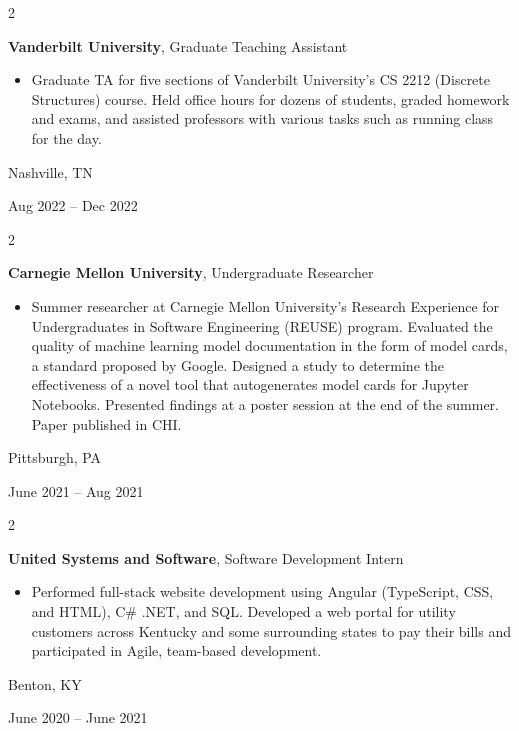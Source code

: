 \documentclass[10pt, letterpaper]{article}
\newenvironment{highlights}{
    \begin{itemize}[
        topsep=0.10 cm,
        parsep=0.10 cm,
        partopsep=0pt,
        itemsep=0pt,
        leftmargin=0.4 cm + 10pt
    ]
}{
    \end{itemize}
} %
\newenvironment{twocolentry}[2][]{
    \onecolentry
    \def\secondColumn{#2}
    \setcolumnwidth{\fill, 4.5 cm}
    \begin{paracol}{2}
}{
    \switchcolumn \raggedleft \secondColumn
    \end{paracol}
    \endonecolentry
} %
\begin{document}
        \vspace{0.2 cm}

        \begin{twocolentry}{
            Nashville, TN

        Aug 2022 – Dec 2022
        }
            \textbf{Vanderbilt University}, Graduate Teaching Assistant
            \begin{highlights}
                \item Graduate TA for five sections of Vanderbilt University's CS 2212 (Discrete Structures) course. Held office hours for dozens of students, graded homework and exams, and assisted professors with various tasks such as running class for the day.
            \end{highlights}
        \end{twocolentry}


        \vspace{0.2 cm}

        \begin{twocolentry}{
            Pittsburgh, PA

        June 2021 – Aug 2021
        }
            \textbf{Carnegie Mellon University}, Undergraduate Researcher
            \begin{highlights}
                \item Summer researcher at Carnegie Mellon University’s Research Experience for Undergraduates in Software Engineering (REUSE) program. Evaluated the quality of machine learning model documentation in the form of model cards, a standard proposed by Google. Designed a study to determine the effectiveness of a novel tool that autogenerates model cards for Jupyter Notebooks. Presented findings at a poster session at the end of the summer. Paper published in CHI.
            \end{highlights}
        \end{twocolentry}


        \vspace{0.2 cm}

        \begin{twocolentry}{
            Benton, KY

        June 2020 – June 2021
        }
            \textbf{United Systems and Software}, Software Development Intern
            \begin{highlights}
                \item Performed full-stack website development using Angular (TypeScript, CSS, and HTML), C\# .NET, and SQL. Developed a web portal for utility customers across Kentucky and some surrounding states to pay their bills and participated in Agile, team-based development.
            \end{highlights}
        \end{twocolentry}
\end{document}
